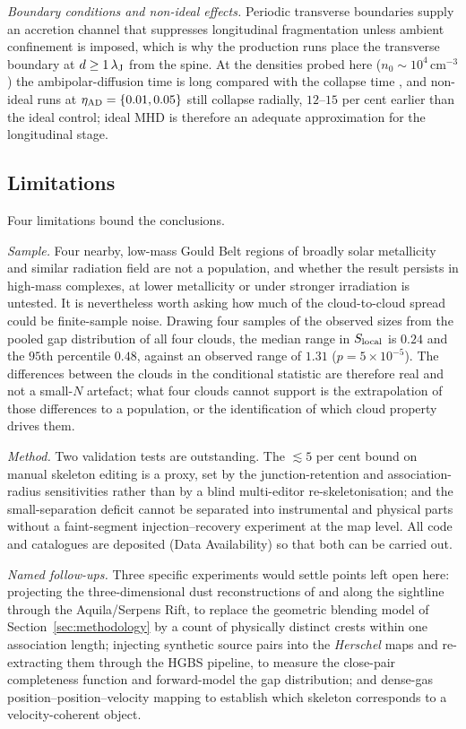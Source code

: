 \documentclass[usenatbib,twoside,twocolumn]{mnras}
\begin{document}
\emph{Boundary conditions and non-ideal effects.} Periodic transverse boundaries supply an accretion channel that suppresses longitudinal fragmentation unless ambient confinement is imposed, which is why the production runs place the transverse boundary at $d\geq1\,\lambda_{\rm J}$ from the spine. At the densities probed here ($n_0\sim10^4$\,cm$^{-3}$) the ambipolar-diffusion time is long compared with the collapse time \citep{Tassis2004}, and non-ideal runs at $\eta_{\rm AD}=\{0.01,0.05\}$ still collapse radially, $12$--$15$ per cent earlier than the ideal control; ideal MHD is therefore an adequate approximation for the longitudinal stage.



\subsection{Limitations}
\label{sec:limitations}

Four limitations bound the conclusions.

\emph{Sample.} Four nearby, low-mass Gould Belt regions of broadly solar metallicity and similar radiation field are not a population, and whether the result persists in high-mass complexes, at lower metallicity or under stronger irradiation is untested. It is nevertheless worth asking how much of the cloud-to-cloud spread could be finite-sample noise. Drawing four samples of the observed sizes from the pooled gap distribution of all four clouds, the median range in $S_{\rm local}$ is $0.24$ and the $95$th percentile $0.48$, against an observed range of $1.31$ ($p=5\times10^{-5}$). The differences between the clouds in the conditional statistic are therefore real and not a small-$N$ artefact; what four clouds cannot support is the extrapolation of those differences to a population, or the identification of which cloud property drives them.

\emph{Method.} Two validation tests are outstanding. The $\lesssim5$ per cent bound on manual skeleton editing is a proxy, set by the junction-retention and association-radius sensitivities rather than by a blind multi-editor re-skeletonisation; and the small-separation deficit cannot be separated into instrumental and physical parts without a faint-segment injection--recovery experiment at the map level. All code and catalogues are deposited (Data Availability) so that both can be carried out.

\emph{Named follow-ups.} Three specific experiments would settle points left open here: projecting the three-dimensional dust reconstructions of \citet{Zucker2020} and \citet{Green2024} along the sightline through the Aquila/Serpens Rift, to replace the geometric blending model of Section~\ref{sec:methodology} by a count of physically distinct crests within one association length; injecting synthetic source pairs into the \textit{Herschel} maps and re-extracting them through the HGBS pipeline, to measure the close-pair completeness function and forward-model the gap distribution; and dense-gas position--position--velocity mapping to establish which skeleton corresponds to a velocity-coherent object.
\end{document}
